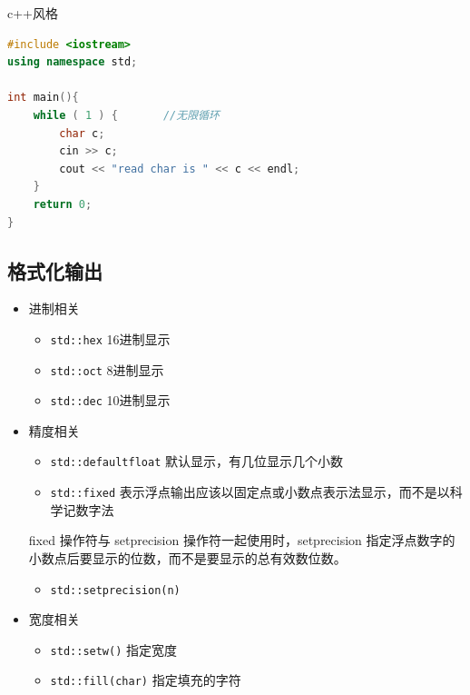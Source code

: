 \documentclass[
  paper=a4,
  ,captions=tableheading
]{scrbook}
\newcommand{\passthrough}[1]{#1}
\providecommand{\tightlist}{%
  \setlength{\itemsep}{0pt}\setlength{\parskip}{0pt}}
\begin{document}
c++风格

\begin{lstlisting}[language={C++}]
#include <iostream>
using namespace std;

int main(){
    while ( 1 ) {       //无限循环
        char c;
        cin >> c;
        cout << "read char is " << c << endl;
    }
    return 0;
}
\end{lstlisting}

\hypertarget{ux683cux5f0fux5316ux8f93ux51fa}{%
\subsection{格式化输出}\label{ux683cux5f0fux5316ux8f93ux51fa}}

\begin{itemize}
\item
  进制相关

  \begin{itemize}
  \tightlist
  \item
    \passthrough{\lstinline!std::hex!} 16进制显示
  \item
    \passthrough{\lstinline!std::oct!} 8进制显示
  \item
    \passthrough{\lstinline!std::dec!} 10进制显示
  \end{itemize}
\item
  精度相关

  \begin{itemize}
  \tightlist
  \item
    \passthrough{\lstinline!std::defaultfloat!}
    默认显示，有几位显示几个小数
  \item
    \passthrough{\lstinline!std::fixed!}
    表示浮点输出应该以固定点或小数点表示法显示，而不是以科学记数字法
  \end{itemize}

  fixed 操作符与 setprecision 操作符一起使用时，setprecision
  指定浮点数字的小数点后要显示的位数，而不是要显示的总有效数位数。

  \begin{itemize}
  \tightlist
  \item
    \passthrough{\lstinline!std::setprecision(n)!}
  \end{itemize}
\item
  宽度相关

  \begin{itemize}
  \tightlist
  \item
    \passthrough{\lstinline!std::setw()!} 指定宽度
  \item
    \passthrough{\lstinline!std::fill(char)!} 指定填充的字符
  \end{itemize}
\end{itemize}
\end{document}
